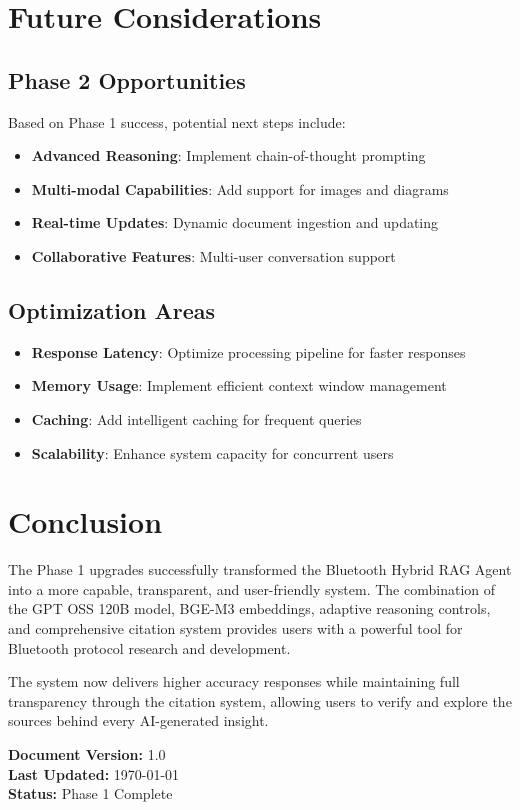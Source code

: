 \documentclass[12pt,a4paper]{article}
\begin{document}
\section{Future Considerations}

\subsection{Phase 2 Opportunities}
Based on Phase 1 success, potential next steps include:

\begin{itemize}
    \item \textbf{Advanced Reasoning}: Implement chain-of-thought prompting
    \item \textbf{Multi-modal Capabilities}: Add support for images and diagrams
    \item \textbf{Real-time Updates}: Dynamic document ingestion and updating
    \item \textbf{Collaborative Features}: Multi-user conversation support
\end{itemize}

\subsection{Optimization Areas}
\begin{itemize}
    \item \textbf{Response Latency}: Optimize processing pipeline for faster responses
    \item \textbf{Memory Usage}: Implement efficient context window management
    \item \textbf{Caching}: Add intelligent caching for frequent queries
    \item \textbf{Scalability}: Enhance system capacity for concurrent users
\end{itemize}

\section{Conclusion}

The Phase 1 upgrades successfully transformed the Bluetooth Hybrid RAG Agent into a more capable, transparent, and user-friendly system. The combination of the GPT OSS 120B model, BGE-M3 embeddings, adaptive reasoning controls, and comprehensive citation system provides users with a powerful tool for Bluetooth protocol research and development.

The system now delivers higher accuracy responses while maintaining full transparency through the citation system, allowing users to verify and explore the sources behind every AI-generated insight.

\vspace{1cm}
\noindent\textbf{Document Version:} 1.0 \\
\textbf{Last Updated:} \today \\
\textbf{Status:} Phase 1 Complete
\end{document}
